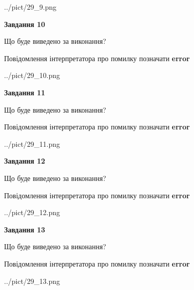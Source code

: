 \documentclass[11pt, ukrainian]{article}
\begin{document}
{\begin {large}
\begin{center}
	{../pict/29_9.png}
\end{center}
\newpage

{\begin {center}\textbf{Завдання 10}\end {center}}\par
Що буде виведено за виконання? \par
Повідомлення інтерпретатора про помилку позначати \textbf{error}

\begin{center}
	{../pict/29_10.png}
\end{center}
\newpage

{\begin {center}\textbf{Завдання 11}\end {center}}\par
Що буде виведено за виконання? \par
Повідомлення інтерпретатора про помилку позначати \textbf{error}

\begin{center}
	{../pict/29_11.png}
\end{center}
\newpage

{\begin {center}\textbf{Завдання 12}\end {center}}\par
Що буде виведено за виконання? \par
Повідомлення інтерпретатора про помилку позначати \textbf{error}

\begin{center}
	{../pict/29_12.png}
\end{center}
\newpage

{\begin {center}\textbf{Завдання 13}\end {center}}\par
Що буде виведено за виконання? \par
Повідомлення інтерпретатора про помилку позначати \textbf{error}

\begin{center}
	{../pict/29_13.png}
\end{center}
\newpage


\end{large}}
\end{document}

